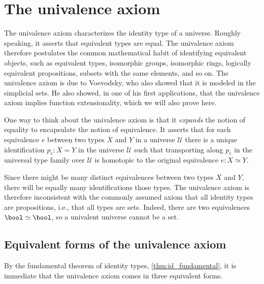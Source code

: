 \section{The univalence axiom}

The univalence axiom characterizes the identity type of a universe. Roughly speaking, it asserts that equivalent types are equal. The univalence axiom therefore postulates the common mathematical habit of identifying equivalent objects, such as equivalent types, isomorphic groups, isomorphic rings, logically equivalent propositions, subsets with the same elements, and so on. The univalence axiom is due to Voevodsky, who also showed that it is modeled in the simplicial sets. He also showed, in one of his first applications, that the univalence axiom implies function extensionality, which we will also prove here.

One way to think about the univalence axiom is that it \emph{expands} the notion of equality to encapsulate the notion of equivalence. It asserts that for each equivalence $e$ between two types $X$ and $Y$ in a universe $\mathcal{U}$ there is a unique identification $p_e:X=Y$ in the universe $\mathcal{U}$ such that transporting along $p_e$ in the universal type family over $\mathcal{U}$ is homotopic to the original equivalence $e:X\simeq Y$. 

Since there might be many distinct equivalences between two types $X$ and $Y$, there will be equally many identifications those types. The univalence axiom is therefore inconsistent with the commonly assumed axiom that all identity types are propositions, i.e., that all types are sets. Indeed, there are two equivalences $\bool\simeq\bool$, so a univalent universe cannot be a set.

\subsection{Equivalent forms of the univalence axiom}
By the fundamental theorem of identity types, \cref{thm:id_fundamental}, it is immediate that the univalence axiom comes in three equivalent forms.

